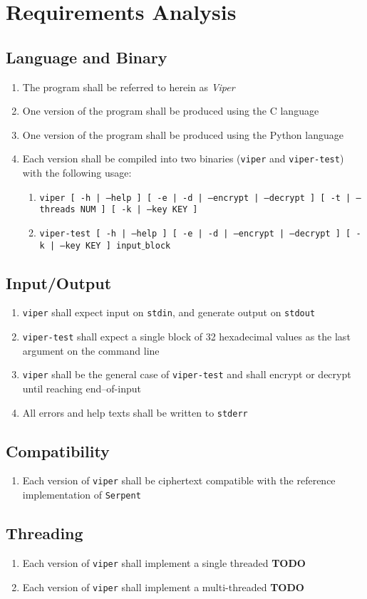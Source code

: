 \section{Requirements Analysis}

\subsection{Language and Binary}
\begin{enumerate}
\item The program shall be referred to herein as \emph{Viper}
\item One version of the program shall be produced using the C language
\item One version of the program shall be produced using the Python language
\item Each version shall be compiled into two binaries (\texttt{viper} and \texttt{viper-test}) with the following usage:
	\begin{enumerate}
	\item \texttt{viper [ -h | --help ]  [ -e | -d | --encrypt | --decrypt ] [ -t | --threads NUM ] [ -k | --key KEY ]}
	\item \texttt{viper-test [ -h | --help ]  [ -e | -d | --encrypt | --decrypt ] [ -k | --key KEY ] input$\_$block}
	\end{enumerate}
\end{enumerate}

\subsection{Input/Output}
\begin{enumerate}
\item \texttt{viper} shall expect input on \texttt{stdin}, and generate output on \texttt{stdout}
\item \texttt{viper-test} shall expect a single block of 32 hexadecimal values as the last argument on the command line
\item \texttt{viper} shall be the general case of \texttt{viper-test} and shall encrypt or decrypt until reaching end--of-input
\item All errors and help texts shall be written to \texttt{stderr}
\end{enumerate}

\subsection{Compatibility}
\begin{enumerate}
\item Each version of \texttt{viper} shall be ciphertext compatible with the reference implementation of \texttt{Serpent}
\end{enumerate}

\subsection{Threading}
\begin{enumerate}
\item Each version of \texttt{viper} shall implement a single threaded \textbf{TODO}
\item Each version of \texttt{viper} shall implement a multi-threaded \textbf{TODO}
\end{enumerate}



